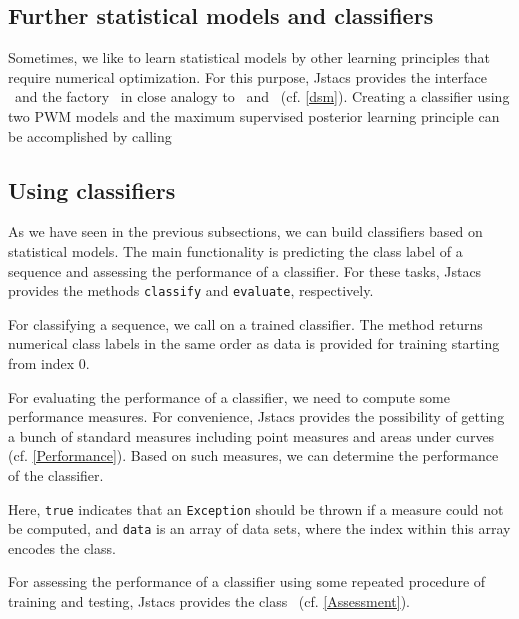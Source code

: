 \subsection{Further statistical models and classifiers}

Sometimes, we like to learn statistical models by other learning principles that require numerical optimization. For this purpose, Jstacs provides the interface \DiffSM~and the factory \DiffSMFactory~in close analogy to \TrainSM~and \TrainSMFactory~(cf. \ref{dsm}). Creating a classifier using two PWM models and the maximum supervised posterior learning principle can be accomplished by calling
\renewcommand{\codefile}{recipes/CreateMSPClassifier.java}
\setcounter{off}{49}
\addtocounter{off}{2}
\addtocounter{off}{2}

\subsection{Using classifiers}

\renewcommand{\codefile}{recipes/TrainClassifier.java}
As we have seen in the previous subsections, we can build classifiers based on statistical models. The main functionality is predicting the class label of a sequence and assessing the performance of a classifier. For these tasks, Jstacs provides the methods \lstinline+classify+ and \lstinline+evaluate+, respectively.

For classifying a sequence, we call
\setcounter{off}{58}
on a trained classifier. The method returns numerical class labels in the same order as data is provided for training starting from index $0$.

For evaluating the performance of a classifier, we need to compute some performance measures. For convenience, Jstacs provides the possibility of getting a bunch of standard measures including point measures and areas under curves (cf. \ref{Performance}). Based on such measures, we can determine the performance of the classifier.
\addtocounter{off}{5}
Here, \lstinline+true+ indicates that an \lstinline+Exception+ should be thrown if a measure could not be computed, and \lstinline+data+ is an array of data sets, where the index within this array encodes the class.

For assessing the performance of a classifier using some repeated procedure of training and testing, Jstacs provides the class \ClassifierAssessment~(cf. \ref{Assessment}).

\renewcommand{\codefile}{\defaultcodefile}
\setcounter{off}{1}
